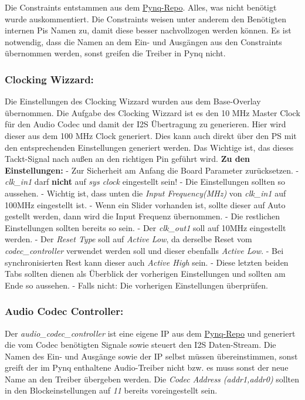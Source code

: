 \documentclass[
  ngerman,
  letterpaper,
  DIV=11]{scrreprt}
\begin{document}
Die Constraints entstammen aus dem
\href{https://github.com/Xilinx/PYNQ/tree/master}{Pynq-Repo}. Alles, was
nicht benötigt wurde auskommentiert. Die Constraints weisen unter
anderem den Benötigten internen Pis Namen zu, damit diese besser
nachvollzogen werden können. Es ist notwendig, dass die Namen an dem
Ein- und Ausgängen aus den Constraints übernommen werden, sonst greifen
die Treiber in Pynq nicht.

\subsubsection{Clocking Wizzard:}\label{clocking-wizzard}

Die Einstellungen des Clocking Wizzard wurden aus dem Base-Overlay
übernommen. Die Aufgabe des Clocking Wizzard ist es den 10 MHz Master
Clock für den Audio Codec und damit der I2S Übertragung zu generieren.
Hier wird dieser aus dem 100 MHz Clock generiert. Dies kann auch direkt
über den PS mit den entsprechenden Einstellungen generiert werden. Das
Wichtige ist, das dieses Tackt-Signal nach außen an den richtigen Pin
geführt wird. \textbf{Zu den Einstellungen:} - Zur Sicherheit am Anfang
die Board Parameter zurücksetzen. - \emph{clk\_in1} darf \textbf{nicht}
auf \emph{sys clock} eingestellt sein! - Die Einstellungen sollten so
aussehen. - Wichtig ist, dass unten die \emph{Input Frequency(MHz)} von
\emph{clk\_in1} auf 100MHz eingestellt ist. - Wenn ein Slider vorhanden
ist, sollte dieser auf Auto gestellt werden, dann wird die Input
Frequenz übernommen. - Die restlichen Einstellungen sollten bereits so
sein. - Der \emph{clk\_out1} soll auf 10MHz eingestellt werden. - Der
\emph{Reset Type} soll auf \emph{Active Low}, da derselbe Reset vom
\emph{codec\_controller} verwendet werden soll und dieser ebenfalls
\emph{Active Low}. - Bei synchronisierten Rest kann dieser auch
\emph{Active High} sein. - Diese letzten beiden Tabs sollten dienen als
Überblick der vorherigen Einstellungen und sollten am Ende so aussehen.
- Falls nicht: Die vorherigen Einstellungen überprüfen.

\subsubsection{Audio Codec Controller:}\label{audio-codec-controller}

Der \emph{audio\_codec\_controller} ist eine eigene IP aus dem
\href{https://github.com/Xilinx/PYNQ/tree/master}{Pynq-Repo} und
generiert die vom Codec benötigten Signale sowie steuert den I2S
Daten-Stream. Die Namen des Ein- und Ausgänge sowie der IP selbst müssen
übereinstimmen, sonst greift der im Pynq enthaltene Audio-Treiber nicht
bzw. es muss sonst der neue Name an den Treiber übergeben werden. Die
\emph{Codec Address (addr1,addr0)} sollten in den Blockeinstellungen auf
\emph{11} bereits voreingestellt sein.
\end{document}

